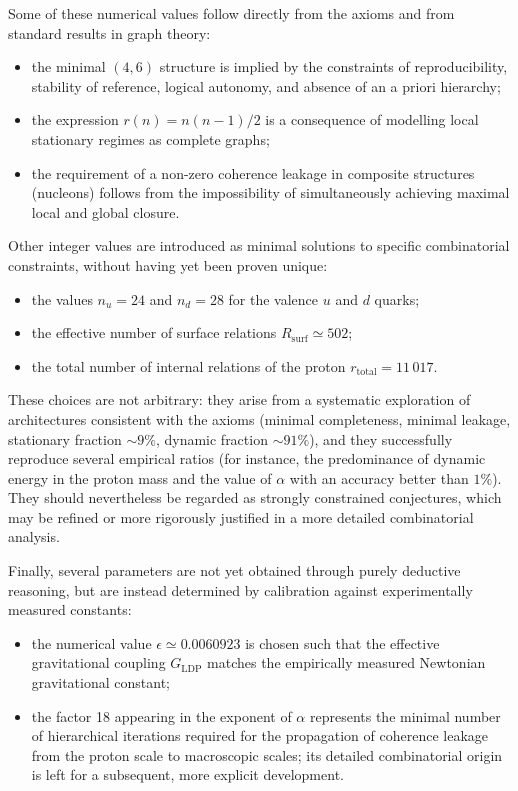 \documentclass[11pt,a4paper]{article}
\begin{document}
Some of these numerical values follow directly from the axioms and from standard results in graph theory:
\begin{itemize}[label=-]
  \item the minimal \((4,6)\) structure is implied by the constraints of reproducibility, stability of reference, logical autonomy, and absence of an a priori hierarchy;
  \item the expression \(r(n) = n(n-1)/2\) is a consequence of modelling local stationary regimes as complete graphs;
  \item the requirement of a non-zero coherence leakage in composite structures (nucleons) follows from the impossibility of simultaneously achieving maximal local and global closure.
\end{itemize}

Other integer values are introduced as minimal solutions to specific combinatorial constraints, without having yet been proven unique:
\begin{itemize}[label=-]
  \item the values \(n_u = 24\) and \(n_d = 28\) for the valence \(u\) and \(d\) quarks;
  \item the effective number of surface relations \(R_{\mathrm{surf}} \simeq 502\);
  \item the total number of internal relations of the proton \(r_{\mathrm{total}} = 11\,017\).
\end{itemize}
These choices are not arbitrary: they arise from a systematic exploration of architectures consistent with the axioms (minimal completeness, minimal leakage, stationary fraction \(\sim 9\%\), dynamic fraction \(\sim 91\%\)), and they successfully reproduce several empirical ratios (for instance, the predominance of dynamic energy in the proton mass and the value of \(\alpha\) with an accuracy better than \(1\%\)). They should nevertheless be regarded as strongly constrained conjectures, which may be refined or more rigorously justified in a more detailed combinatorial analysis.

Finally, several parameters are not yet obtained through purely deductive reasoning, but are instead determined by calibration against experimentally measured constants:
\begin{itemize}[label=-]
  \item the numerical value \(\epsilon \simeq 0.0060923\) is chosen such that the effective gravitational coupling \(G_{\mathrm{LDP}}\) matches the empirically measured Newtonian gravitational constant;
  \item the factor 18 appearing in the exponent of \(\alpha\) represents the minimal number of hierarchical iterations required for the propagation of coherence leakage from the proton scale to macroscopic scales; its detailed combinatorial origin is left for a subsequent, more explicit development.
\end{itemize}
\end{document}
